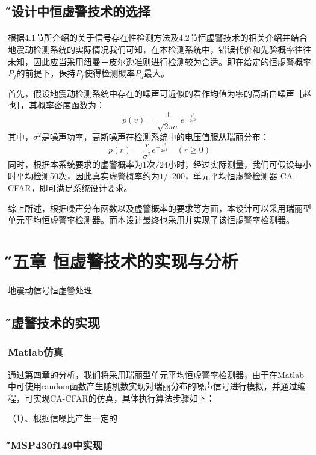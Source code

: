 \documentclass[12pt]{article} %
\newcommand{\xiaosanhao}{\fontsize{15pt}{\baselineskip}\selectfont}    %
\begin{document}
		
	\subsection{\H 本设计中恒虚警技术的选择 } 
 	  \paragraph{ \quad} 根据4.1节所介绍的关于信号存在性检测方法及4.2节恒虚警技术的相关介绍并结合地震动检测系统的实际情况我们可知，在本检测系统中，错误代价和先验概率往往未知，因此应当采用纽曼－皮尔逊准则进行检测较为合适。即在给定的恒虚警概率$P_f$的前提下，保持$P_f$使得检测概率$P_d$最大。
 	\par 首先，假设地震动检测系统中存在的噪声可近似的看作均值为零的高斯白噪声［赵也］，其概率密度函数为：
	\begin{equation}
	p(v) = \frac{1}{\sqrt{2\pi\sigma}}e^{-\frac{v^2}{2\sigma^2}}
	\end{equation}
	其中，$\sigma^2$是噪声功率，高斯噪声在检测系统中的电压值服从瑞丽分布：
	\begin{equation}
	p(r) = \frac{r}{\sigma^2}e^{-\frac{r^2}{2\sigma^2}}  {\quad(r    \geq    0)}
	\end{equation}
	同时，根据本系统要求的虚警概率为$1次/24小时$，经过实际测量，我们可假设每小时平均检测50次，因此真实虚警概率约为$1/1200$，单元平均恒虚警检测器 CA-CFAR，即可满足系统设计要求。
	\par 综上所述，根据噪声分布函数以及虚警概率的要求等方面，本设计可以采用瑞丽型单元平均恒虚警率检测器。而本设计最终也采用并实现了该恒虚警率检测器。 
 	
 
  \section{\xiaosanhao \H 第五章 \quad 恒虚警技术的实现与分析}
  地震动信号恒虚警处理
  	\subsection{\H 恒虚警技术的实现 }
  	\subsubsection{\H Matlab仿真 }
  	通过第四章的分析，我们将采用瑞丽型单元平均恒虚警率检测器，由于在Matlab中可使用random函数产生随机数实现对瑞丽分布的噪声信号进行模拟，并通过编程，可实现CA-CFAR的仿真，具体执行算法步骤如下：
  	\par （1）、根据信噪比产生一定的
  	\subsubsection{\H 在MSP430f149中实现 }
  	
\end{document}
